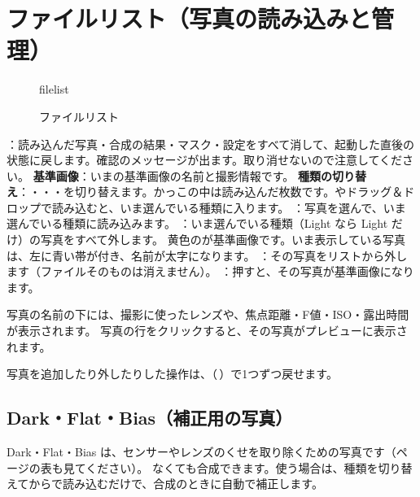 \clearpage
\section{ファイルリスト（写真の読み込みと管理）}\label{sec:filelist}

\begin{figure}[H]
\centering
\begin{screenshot}[0.36\linewidth]{filelist}
\end{screenshot}
\caption{ファイルリスト}
\end{figure}

\begin{callouts}
 ：読み込んだ写真・合成の結果・マスク・設定をすべて消して、起動した直後の状態に戻します。確認のメッセージが出ます。取り消せないので注意してください。
 \textbf{基準画像}：いまの基準画像の名前と撮影情報です。
 \textbf{種類の切り替え}：・・・を切り替えます。かっこの中は読み込んだ枚数です。やドラッグ＆ドロップで読み込むと、いま選んでいる種類に入ります。
 ：写真を選んで、いま選んでいる種類に読み込みます。
 ：いま選んでいる種類（Light なら Light だけ）の写真をすべて外します。
 黄色のが基準画像です。いま表示している写真は、左に青い帯が付き、名前が太字になります。
 ：その写真をリストから外します（ファイルそのものは消えません）。
 ：押すと、その写真が基準画像になります。
\end{callouts}

写真の名前の下には、撮影に使ったレンズや、焦点距離・F値・ISO・露出時間が表示されます。
写真の行をクリックすると、その写真がプレビューに表示されます。

\begin{memo}[取り消し]
写真を追加したり外したりした操作は、（\,）で1つずつ戻せます。
\end{memo}

\subsection{Dark・Flat・Bias（補正用の写真）}\label{sec:calibration}

Dark・Flat・Bias は、センサーやレンズのくせを取り除くための写真です（\pageref{sec:requirements}ページの表も見てください）。
なくても合成できます。使う場合は、種類を切り替えてからで読み込むだけで、合成のときに自動で補正します。

